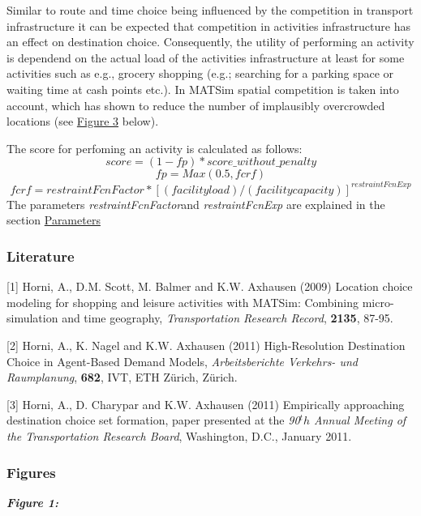 \documentclass[a4paper,11pt]{report}
\begin{document}
Similar to route and time choice being influenced by  the competition in transport infrastructure it can be expected that  competition in activities infrastructure has an effect on destination  choice. Consequently, the utility of performing an activity is dependend  on the actual load of the activities infrastructure at least for some  activities such as e.g., grocery shopping (e.g.; searching for a parking  space or waiting time at cash points etc.). In MATSim spatial  competition is taken into account, which has shown to reduce the number  of implausibly overcrowded locations (see \hyperlink{Figure3}{Figure 3} below).

The score for perfoming an activity is calculated as follows:
\[
score = (1- fp) * score\_without\_penalty
\]
\[
fp = Max(0.5, fcrf)
\]
\[
fcrf = restraintFcnFactor * [(facility load) / (facility capacity)]^{restraintFcnExp}
\]
The parameters \emph{restraintFcnFactor}and \emph{restraintFcnExp }are explained in the section \hyperlink{parameters}{Parameters}


\subsubsection{\textbf{Literature}}

[1] Horni, A., D.M. Scott, M. Balmer and K.W. Axhausen (2009)  Location choice modeling for shopping and leisure activities with  MATSim: Combining micro-simulation and time geography, \emph{Transportation Research Record}, \textbf{2135}, 87-95.

[2] Horni, A., K. Nagel and K.W. Axhausen (2011) High-Resolution Destination Choice in Agent-Based Demand Models, \emph{Arbeitsberichte Verkehrs- und Raumplanung}, \textbf{682}, IVT, ETH Zürich, Zürich.

[3] Horni, A., D. Charypar and K.W. Axhausen (2011) Empirically  approaching destination choice set formation, paper presented at the \emph{90$^th$ Annual Meeting of the Transportation Research Board}, Washington, D.C., January 2011.

\subsubsection{Figures}

\emph{\textbf{Figure 1:}}



\end{document}
